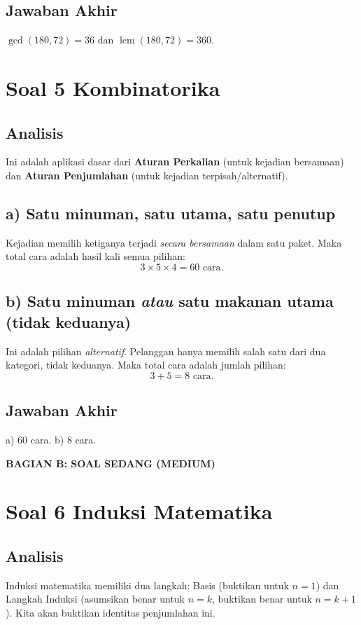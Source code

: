 \documentclass[12pt,a4paper]{article}
\begin{document}
\subsection*{Jawaban Akhir}
$\gcd(180,72) = 36$ dan $\operatorname{lcm}(180,72) = 360$. 

\newpage
\section*{Soal 5 Kombinatorika}
\subsection*{Analisis}
Ini adalah aplikasi dasar dari \textbf{Aturan Perkalian} (untuk kejadian bersamaan) dan \textbf{Aturan Penjumlahan} (untuk kejadian terpisah/alternatif).

\subsection*{a) Satu minuman, satu utama, satu penutup}
Kejadian memilih ketiganya terjadi \emph{secara bersamaan} dalam satu paket. Maka total cara adalah hasil kali semua pilihan:
\[
3 \times 5 \times 4 = 60 \text{ cara}.
\]

\subsection*{b) Satu minuman \emph{atau} satu makanan utama (tidak keduanya)}
Ini adalah pilihan \emph{alternatif}. Pelanggan hanya memilih salah satu dari dua kategori, tidak keduanya. Maka total cara adalah jumlah pilihan:
\[
3 + 5 = 8 \text{ cara}.
\]

\subsection*{Jawaban Akhir}
a) 60 cara. \quad b) 8 cara. 

\newpage
\begin{center}
\Large \textbf{BAGIAN B: SOAL SEDANG (MEDIUM)}
\end{center}

\section*{Soal 6 Induksi Matematika}
\subsection*{Analisis}
Induksi matematika memiliki dua langkah: Basis (buktikan untuk $n=1$) dan Langkah Induksi (asumsikan benar untuk $n=k$, buktikan benar untuk $n=k+1$). Kita akan buktikan identitas penjumlahan ini.
\end{document}
